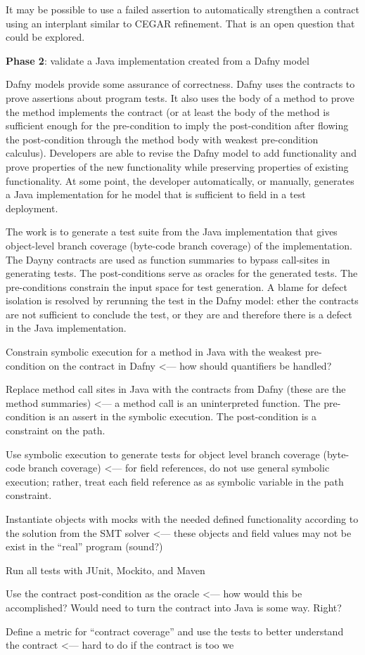 \documentclass[11pt,onecolumn,notitlepage]{article}
\begin{document}
It may be possible to use a failed assertion to automatically strengthen a contract using an interplant similar to CEGAR refinement. That is an open question that could be explored.

\noindent\textbf{Phase 2}: validate a Java implementation created from a Dafny model

Dafny models provide some assurance of correctness. Dafny uses the contracts to prove assertions about program tests. It also uses the body of a method to prove the method implements the contract (or at least the body of the method is sufficient enough for the pre-condition to imply the post-condition after flowing the post-condition through the method body with weakest pre-condition calculus). Developers are able to revise the Dafny model to add functionality and prove properties of the new functionality while preserving properties of existing functionality. At some point, the developer automatically, or manually, generates a Java implementation for he model that is sufficient to field in a test deployment. 

The work is to generate a test suite from the Java implementation that gives object-level branch coverage (byte-code branch coverage) of the implementation. The Dayny contracts are used as function summaries to bypass call-sites in generating tests. The post-conditions serve as oracles for the generated tests. The pre-conditions constrain the input space for test generation. A blame for defect isolation is resolved by rerunning the test in the Dafny model: ether the contracts are not sufficient to conclude the test, or they are and therefore there is a defect in the Java implementation.

\begin{compactitem}
  \item Constrain symbolic execution for a method in Java with the weakest pre-condition on the contract in Dafny <— how should quantifiers be handled?
  \item Replace method call sites in Java with the contracts from Dafny (these are the method summaries) <— a method call is an uninterpreted function. The pre-condition is an assert in the symbolic execution. The post-condition is a constraint on the path.
  \item Use symbolic execution to generate tests for object level branch coverage (byte-code branch coverage) <— for field references, do not use general symbolic execution; rather, treat each field reference as as symbolic variable in the path constraint. 
  \item Instantiate objects with mocks with the needed defined functionality according to the solution from the SMT solver <— these objects and field values may not be exist in the “real” program (sound?)
  \item Run all tests with JUnit, Mockito, and Maven
  \item Use the contract post-condition as the oracle <— how would this be accomplished? Would need to turn the contract into Java is some way. Right?
  \item Define a metric for “contract coverage” and use the tests to better understand the contract <— hard to do if the contract is too we
\end{compactitem}
\end{document}
